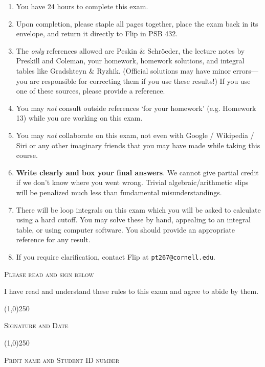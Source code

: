 \documentclass[12pt]{article}
\begin{document}
\begin{spacing}{.55}
\begin{enumerate}
\item You have 24 hours to complete this exam. 
\item Upon completion, please staple all pages together, place the exam back in its envelope, and return it directly to Flip in PSB 432.
%
\item The \textit{only} references allowed are Peskin \& Schr\"oeder, the lecture notes by Preskill and Coleman, your homework, homework solutions, and integral tables like Gradshteyn \& Ryzhik. (Official solutions may have minor errors---you are responsible for correcting them if you use these results!) If you use one of these sources, please provide a reference.
\item You may \textit{not} consult outside references `for your homework' (e.g. Homework 13) while you are working on this exam.
\item You may \textit{not} collaborate on this exam, not even with Google / Wikipedia / Siri or any other imaginary friends that you may have made while taking this course.
\item \textbf{Write clearly and box your final answers}. We cannot give partial credit if we don't know where you went wrong. Trivial algebraic/arithmetic slips will be penalized much less than fundamental misunderstandings.
\item There will be loop integrals on this exam which you will be asked to calculate using a hard cutoff. You may solve these by hand, appealing to an integral table, or using computer software. You should provide an appropriate reference for any result.
\item If you require clarification, contact Flip at \texttt{pt267@cornell.edu}.
\end{enumerate}
\end{spacing}
\vspace{.7 cm}

\textsc{Please read and sign below}

I have read and understand these rules to this exam and agree to abide by them.
\vspace{2em}

\line(1,0){250} 

\textsc{Signature and Date}

\vspace{2em}

\line(1,0){250} 

\textsc{Print name and Student ID number}
\end{document}
